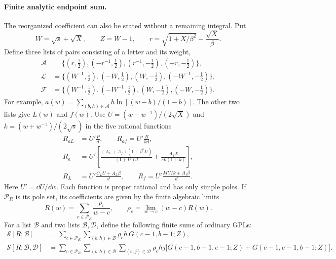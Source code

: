 \paragraph{Finite analytic endpoint sum.} The reorganized coefficient
can also be stated without a remaining integral. Put
\begin{equation}
 W=\sqrt s+\sqrt X,\qquad Z=W-1,\qquad
 r=\sqrt{1+X/\beta^2}-\frac{\sqrt X}{\beta}.
\end{equation}
Define three lists of pairs consisting of a letter and its weight,
\begin{align}
 \mathcal A&=\{(r,\tfrac12),(-r^{-1},\tfrac12),
                  (r^{-1},-\tfrac12),(-r,-\tfrac12)\},\\
 \mathcal L&=\{(W^{-1},\tfrac12),(-W,\tfrac12),
                  (W,-\tfrac12),(-W^{-1},-\tfrac12)\},\\
 \mathcal F&=\{(W^{-1},\tfrac12),(-W^{-1},\tfrac12),
                  (W,-\tfrac12),(-W,-\tfrac12)\}.
\end{align}
For example, $a(w)=\sum_{(b,h)\in\mathcal A}
h\ln[(w-b)/(1-b)]$. The other two lists give $L(w)$ and $f(w)$.
Use $U=(w-w^{-1})/(2\sqrt X)$ and $k=(w+w^{-1})/(2\sqrt s)$
in the five rational functions
\begin{align}
 R_{aL}&=U'\frac P d,\qquad R_{af}=U'\frac B{kd},\\
 R_a&=U'\left[\frac{(A_L+A_f)(1+\beta^2U)}{(1+U)d}
                      +\frac{A_fX}{sk(1+k)}\right],\\
 R_L&=U'\frac{C_LU+A_L\beta}{d},\qquad
 R_f=U'\frac{MU/k+A_f\beta}{d}.
\end{align}
Here $U'=\dd U/\dd w$. Each function is proper rational and has
only simple poles. If $\mathcal P_R$ is its pole set, its coefficients
are given by the finite algebraic limits
\begin{equation}
 R(w)=\sum_{c\in\mathcal P_R}\frac{\rho_c}{w-c},\qquad
 \rho_c=\lim_{w\to c}(w-c)R(w).
\end{equation}
For a list $\mathcal B$ and two lists $\mathcal B,\mathcal D$, define
the following finite sums of ordinary GPLs:
\begin{align}
 \mathcal S[R;\mathcal B]
 &=\sum_{c\in\mathcal P_R}\sum_{(b,h)\in\mathcal B}
       \rho_ch\,G(c-1,b-1;Z),\\
 \mathcal S[R;\mathcal B,\mathcal D]
 &=\sum_{c\in\mathcal P_R}
   \sum_{(b,h)\in\mathcal B}\sum_{(e,j)\in\mathcal D}
   \rho_chj\bigl[G(c-1,b-1,e-1;Z)
                    +G(c-1,e-1,b-1;Z)\bigr].
\end{align}
